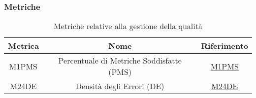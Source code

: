 \subsubsection{Metriche}
\begin{table}[h]
    \centering
    \begin{tabular}{|c|c|c|}
    \hline
    Metrica & Nome & Riferimento \\
    \hline \hline
    M1PMS & Percentuale di Metriche Soddisfatte (PMS) &  \hyperlink{item:M1PMS}{\textcolor{linkcolor}{M1PMS}} \\
    M24DE & Densità degli Errori (DE) &  \hyperlink{item:M24DE}{\textcolor{linkcolor}{M24DE}} \\
    \hline
    \end{tabular}
    \caption{Metriche relative alla gestione della qualità}
\end{table}

